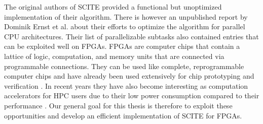 The original authors of \ac{SCITE} provided a functional but unoptimized implementation of their algorithm. There is however an unpublished report by Dominik Ernst et al. \cite{ernst2020Performance} about their efforts to optimize the algorithm for parallel CPU architectures. Their list of parallelizable subtasks also contained entries that can be exploited well on \acsp{FPGA}. \acp{FPGA} are computer chips that contain a lattice of logic, computation, and memory units that are connected via programmable connections. They can be used like complete, reprogrammable computer chips and have already been used extensively for chip prototyping and verification \cite{rodriguez2007features}. In recent years they have also become interesting as computation accelerators for \ac{HPC} users due to their low power consumption compared to their performance \cite{betkaoui2010comparing}. Our general goal for this thesis is therefore to exploit these opportunities and develop an efficient implementation of \ac{SCITE} for \acp{FPGA}. 


